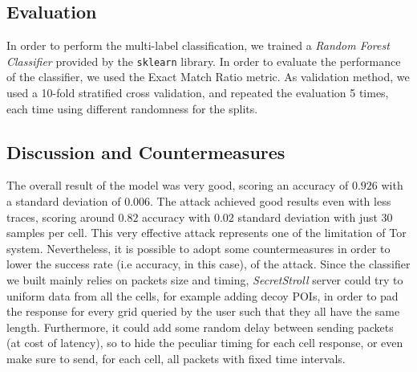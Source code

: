 \documentclass[10pt,conference,compsocconf]{IEEEtran}
\begin{document}
\subsection{Evaluation}
In order to perform the multi-label classification, we trained a \textit{Random Forest Classifier} provided by the \texttt{sklearn} library.
In order to evaluate the performance of the classifier, we used the Exact Match Ratio metric.
As validation method, we used a 10-fold stratified cross validation, and repeated the evaluation 5 times, each time using  different randomness for the splits.


\subsection{Discussion and Countermeasures}
The overall result of the model was very good, scoring an accuracy of $0.926$ with a standard deviation of $0.006$.
The attack achieved good results even with less traces, scoring around $0.82$ accuracy with $0.02$ standard deviation with just 30 samples per cell.
This very effective attack represents one of the limitation of Tor system.
Nevertheless, it is possible to adopt some countermeasures in order to lower the success rate (i.e accuracy, in this case), of the attack.
Since the classifier we built mainly relies on packets size and timing,
\textit{SecretStroll} server could try to uniform data from all the cells, for example adding decoy POIs, in order to pad
the response for every grid queried by the user such that they all have the same length.
Furthermore, it could add some random delay between sending packets (at cost of latency), so to hide the peculiar timing for each cell response, or even make sure to send, for each cell, all packets with fixed time intervals.
\printbibliography
\end{document}
